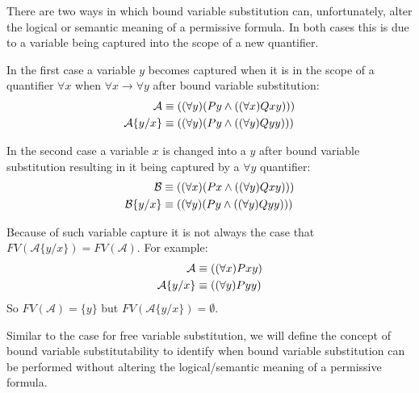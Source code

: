 \documentclass[12pt]{article}
\theoremstyle{break}
\theoremstyle{break}
\theoremstyle{break}
\theoremstyle{break}
\theoremstyle{break}
\newtheorem{informal definition}[definition]{Informal Definition}
\newcommand{\mc}[1]{\mathcal{#1}}
\begin{document}
There are two ways in which bound variable substitution can, unfortunately, alter the logical or semantic meaning of a permissive formula.
In both cases this is due to a variable being captured into the scope of a new quantifier.

In the first case a variable $y$ becomes captured when it is in the scope of a quantifier $\forall x$ when $\forall x \rightarrow \forall y$ after bound variable substitution:
\begin{align}
\mc{A} &\equiv ((\forall y) (Py \land ((\forall x) Qxy))) \notag\\
\mc{A}\{y/x\} &\equiv ((\forall y) (Py \land ((\forall y) Qyy))) \notag
\end{align}

In the second case a variable $x$ is changed into a $y$ after bound variable substitution resulting in it being captured by a $\forall y$ quantifier:
\begin{align}
\mc{B} &\equiv ((\forall x) (Px \land ((\forall y) Qxy))) \notag\\
\mc{B}\{y/x\} &\equiv ((\forall y) (Py \land ((\forall y) Qyy))) \notag
\end{align}

Because of such variable capture it is not always the case that $FV(\mc{A}\{y/x\}) = FV(\mc{A})$.
For example:
\begin{align}
\mc{A} &\equiv ((\forall x) Pxy) \notag\\
\mc{A}\{y/x\} &\equiv ((\forall y) Pyy)\notag
\end{align}
So $FV(\mc{A}) = \{y\}$ but $FV(\mc{A}\{y/x\}) = \emptyset$.

Similar to the case for free variable substitution, we will define the concept of bound variable substitutability to identify when bound variable substitution can be performed without altering the logical/semantic meaning of a permissive formula.
\end{document}
